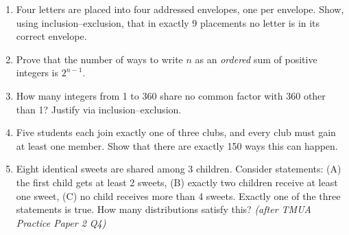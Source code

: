 \documentclass[11pt,a4paper]{article}
\begin{document}
\begin{enumerate}

\item Four letters are placed into four addressed envelopes, one per envelope. Show, using inclusion--exclusion, that in exactly 9 placements no letter is in its correct envelope.

\item Prove that the number of ways to write $n$ as an \emph{ordered} sum of positive integers is $2^{n-1}$.

\item How many integers from 1 to 360 share no common factor with 360 other than 1? Justify via inclusion--exclusion.

\item Five students each join exactly one of three clubs, and every club must gain at least one member. Show that there are exactly 150 ways this can happen.

\item Eight identical sweets are shared among 3 children. Consider statements: (A) the first child gets at least 2 sweets, (B) exactly two children receive at least one sweet, (C) no child receives more than 4 sweets. Exactly one of the three statements is true. How many distributions satisfy this? \textit{\small(after TMUA Practice Paper 2 Q4)}

\end{enumerate}

\end{document}
